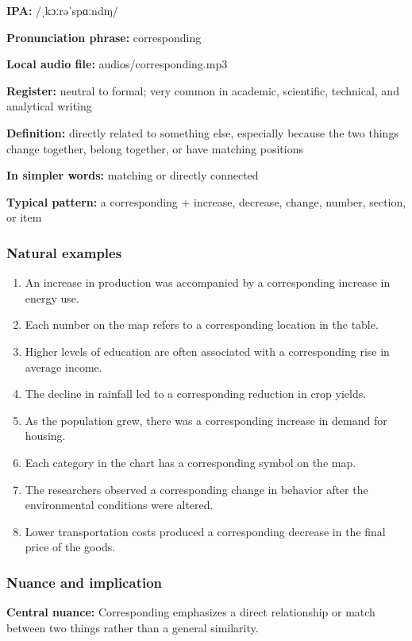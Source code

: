 \documentclass[11pt]{article}
\begin{document}
\textbf{IPA:} /ˌkɔːrəˈspɑːndɪŋ/

\textbf{Pronunciation phrase:} corresponding

\textbf{Local audio file:} audios/corresponding.mp3

\textbf{Register:} neutral to formal; very common in academic, scientific, technical, and analytical writing

\textbf{Definition:} directly related to something else, especially because the two things change together, belong together, or have matching positions

\textbf{In simpler words:} matching or directly connected

\textbf{Typical pattern:} a corresponding + increase, decrease, change, number, section, or item

\subsubsection{Natural examples}
\begin{enumerate}
  \item An increase in production was accompanied by a corresponding increase in energy use.
  \item Each number on the map refers to a corresponding location in the table.
  \item Higher levels of education are often associated with a corresponding rise in average income.
  \item The decline in rainfall led to a corresponding reduction in crop yields.
  \item As the population grew, there was a corresponding increase in demand for housing.
  \item Each category in the chart has a corresponding symbol on the map.
  \item The researchers observed a corresponding change in behavior after the environmental conditions were altered.
  \item Lower transportation costs produced a corresponding decrease in the final price of the goods.
\end{enumerate}

\subsubsection{Nuance and implication}
\textbf{Central nuance:} Corresponding emphasizes a direct relationship or match between two things rather than a general similarity.
\end{document}
